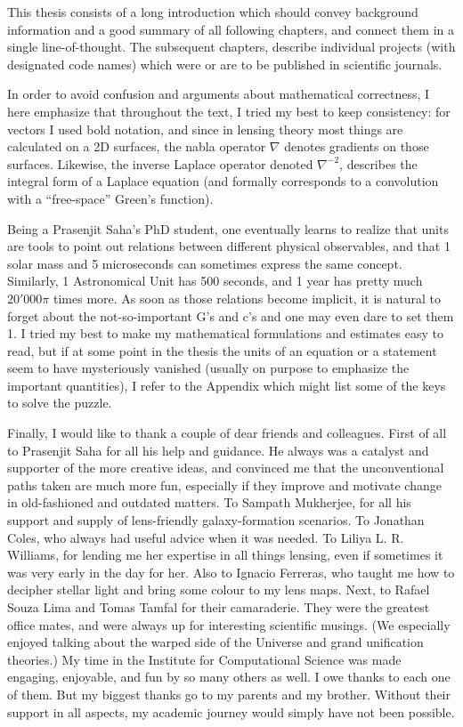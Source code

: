 \small
This thesis consists of a long introduction which should convey background
information and a good summary of all following chapters, and connect them in a
single line-of-thought.  The subsequent chapters, describe individual projects
(with designated code names) which were or are to be published in scientific
journals.

In order to avoid confusion and arguments about mathematical correctness, I here
emphasize that throughout the text, I tried my best to keep consistency: for
vectors I used bold notation, and since in lensing theory most things are
calculated on a 2D surfaces, the nabla operator $\nabla$ denotes gradients on
those surfaces.  Likewise, the inverse Laplace operator denoted $\nabla^{-2}$,
describes the integral form of a Laplace equation (and formally corresponds to a
convolution with a ``free-space'' Green's function).

Being a Prasenjit Saha's PhD student, one eventually learns to realize that
units are tools to point out relations between different physical observables,
and that 1 solar mass and 5 microseconds can sometimes express the same concept.
Similarly, 1 Astronomical Unit has 500 seconds, and 1 year has pretty much
$20'000\pi$ times more.  As soon as those relations become implicit, it is
natural to forget about the not-so-important G's and c's and one may even dare
to set them 1.  I tried my best to make my mathematical formulations and
estimates easy to read, but if at some point in the thesis the units of an
equation or a statement seem to have mysteriously vanished (usually on purpose
to emphasize the important quantities), I refer to the Appendix which might list
some of the keys to solve the puzzle.

Finally, I would like to thank a couple of dear friends and colleagues.  First
of all to Prasenjit Saha for all his help and guidance.  He always was a
catalyst and supporter of the more creative ideas, and convinced me that the
unconventional paths taken are much more fun, especially if they improve and
motivate change in old-fashioned and outdated matters.  To Sampath Mukherjee,
for all his support and supply of lens-friendly galaxy-formation scenarios.  To
Jonathan Coles, who always had useful advice when it was needed.  To Liliya L.
R. Williams, for lending me her expertise in all things lensing, even if
sometimes it was very early in the day for her.  Also to Ignacio Ferreras, who
taught me how to decipher stellar light and bring some colour to my lens maps.
Next, to Rafael Souza Lima and Tomas Tamfal for their camaraderie.  They were
the greatest office mates, and were always up for interesting scientific
musings.  (We especially enjoyed talking about the warped side of the Universe
and grand unification theories.)  My time in the Institute for Computational
Science was made engaging, enjoyable, and fun by so many others as well. I owe
thanks to each one of them.  But my biggest thanks go to my parents and my
brother.  Without their support in all aspects, my academic journey would simply
have not been possible.
\normalsize